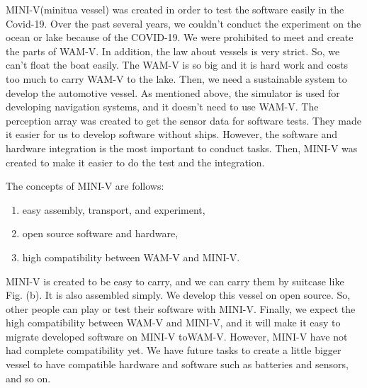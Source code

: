 MINI-V(minitua vessel) was created in order to test the software easily in the Covid-19. Over the past several years, 
we couldn't conduct the experiment on the ocean or lake because of the COVID-19.
We were prohibited to meet and create the parts of WAM-V.
 In addition, the law about vessels is very strict.
So, we can't float the boat easily. The WAM-V is so big and it is hard work and costs too much to carry WAM-V to the lake. 
Then, we need a sustainable system to develop the automotive vessel.
As mentioned above, the simulator is used for developing navigation systems, and it doesn't need to use WAM-V.
The perception array was created to get the sensor data for software tests. They made it easier for us to develop software without ships.
 However, the software and hardware integration is the most important to conduct tasks. Then, MINI-V was created 
to make it easier to do the test and the integration.

The concepts of MINI-V are follows:
\begin{enumerate}
  \item easy assembly, transport, and experiment,
  \item open source software and hardware,
  \item high compatibility between WAM-V and MINI-V.
\end{enumerate}
MINI-V is created to be easy to carry, and we can carry them by suitcase like Fig. (b). 
It is also assembled simply. We develop this vessel on open source. So, other people can play or test their software with MINI-V. Finally,
we expect the high compatibility between WAM-V and MINI-V, and it will make it easy to migrate developed software on MINI-V toWAM-V. However, 
MINI-V have not had complete compatibility yet.
We have future tasks to create a little bigger vessel to have compatible hardware and software such as batteries and sensors, and so on.

